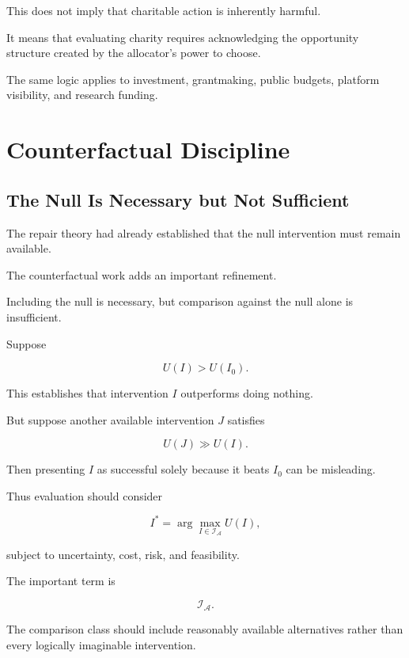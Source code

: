 \documentclass[11pt]{article}
\theoremstyle{remark}
\newcommand{\Adm}{\mathcal{A}}
\begin{document}
This does not imply that charitable action is inherently harmful.

It means that evaluating charity requires acknowledging the opportunity structure created by the allocator's power to choose.

The same logic applies to investment, grantmaking, public budgets, platform visibility, and research funding.

\section{Counterfactual Discipline}

\subsection{The Null Is Necessary but Not Sufficient}

The repair theory had already established that the null intervention must remain available.

The counterfactual work adds an important refinement.

Including the null is necessary, but comparison against the null alone is insufficient.

Suppose

\begin{equation}
U(I)>U(I_0).
\end{equation}

This establishes that intervention $I$ outperforms doing nothing.

But suppose another available intervention $J$ satisfies

\begin{equation}
U(J)\gg U(I).
\end{equation}

Then presenting $I$ as successful solely because it beats $I_0$ can be misleading.

Thus evaluation should consider

\begin{equation}
I^\ast
=
\arg\max_{I\in\mathcal{I}_{\Adm}}
U(I),
\end{equation}

subject to uncertainty, cost, risk, and feasibility.

The important term is

\begin{equation}
\mathcal{I}_{\Adm}.
\end{equation}

The comparison class should include reasonably available alternatives rather than every logically imaginable intervention.
\end{document}
